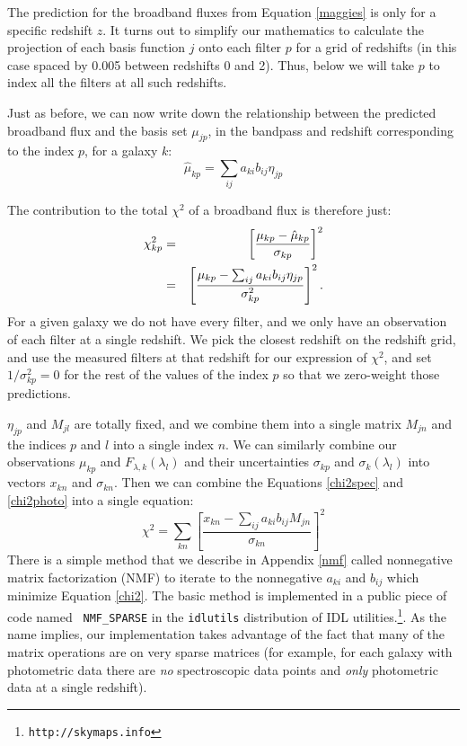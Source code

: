 \documentclass[10pt,preprint]{aastex}
\begin{document}
The prediction for the broadband fluxes from Equation
\ref{maggies} is only for a specific redshift $z$. It turns out to
simplify our mathematics to calculate the projection of each basis
function $j$ onto each filter $p$ for a grid of redshifts (in this
case spaced by 0.005 between redshifts 0 and 2). Thus, below we will
take $p$ to index all the filters at all such redshifts.

Just as before, we can now write down the relationship between the
predicted broadband flux and the basis set $\mu_{jp}$, in the bandpass
and redshift corresponding to the index $p$, for a galaxy $k$:
\begin{equation}
\hat{\mu}_{kp} = \sum_{ij} a_{ki} b_{ij} \eta_{jp}
\end{equation}

The contribution to the total $\chi^2$ of a broadband flux is
therefore just:
\begin{eqnarray}
\label{chi2photo}
\chi^2_{kp} &=& \left[\frac{\mu_{kp} - \hat\mu_{kp}}
{\sigma_{kp}}\right]^2 \cr
&=&
\left[\frac{\mu_{kp} -
\sum_{ij} a_{ki} b_{ij} \eta_{jp}
}{\sigma^2_{kp}}\right]^2. 
\end{eqnarray}
For a given galaxy we do not have every filter, and we only have an
observation of each filter at a single redshift. We pick the closest
redshift on the redshift grid, and use the measured filters at that
redshift for our expression of $\chi^2$, and set $1/\sigma_{kp}^2 = 0$
for the rest of the values of the index $p$ so that we zero-weight
those predictions.

$\eta_{jp}$ and $M_{jl}$ are totally fixed, and we combine them into a
single matrix $M_{jn}$ and the indices $p$ and $l$ into a single index
$n$. We can similarly combine our observations $\mu_{kp}$ and
$F_{\lambda, k}(\lambda_l)$ and their uncertainties $\sigma_{kp}$ and 
$\sigma_{k}(\lambda_l)$ into vectors $x_{kn}$ and $\sigma_{kn}$.
Then we can combine the Equations \ref{chi2spec} and \ref{chi2photo}
into a single equation:
\begin{equation}
\label{chi2}
\chi^2 = \sum_{kn} \left[ 
\frac{x_{kn} - \sum_{ij} a_{ki} b_{ij} M_{jn}}
{\sigma_{kn}} \right]^2
\end{equation}
There is a simple method that we describe in Appendix \ref{nmf} called
nonnegative matrix factorization (NMF) to iterate to the nonnegative
$a_{ki}$ and $b_{ij}$ which minimize Equation \ref{chi2}. The basic
method is implemented in a public piece of code named {\tt
NMF\_SPARSE} in the {\tt idlutils} distribution of IDL
utilities.\footnote{\tt http://skymaps.info}. As the name implies, our
implementation takes advantage of the fact that many of the matrix
operations are on very sparse matrices (for example, for each galaxy
with photometric data there are {\it no} spectroscopic data points and
{\it only} photometric data at a single redshift).
\end{document}
